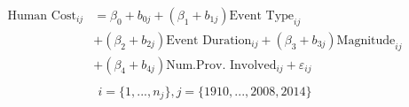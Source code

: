 \begin{align}
\begin{split}
\text{Human Cost}_{ij}&=\beta_0+b_{0j}+(\beta_{1}+b_{1j})\text{Event Type}_{ij}\\ &+(\beta_{2}+b_{2j})\text{Event Duration}_{ij}+(\beta_{3}+b_{3j})\text{Magnitude}_{ij}\\ &+(\beta_{4}+b_{4j})\text{Num.Prov. Involved}_{ij}+\varepsilon_{ij}\\
\end{split}
\label{human_time.tex}
\end{align}
\begin{equation*}
i=\{1,...,n_j\},
j=\{1910,...,2008, 2014\}
\end{equation*}
